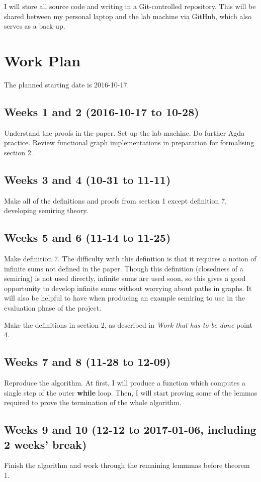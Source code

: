 I will store all source code and writing in a Git-controlled repository.
This will be shared between my personal laptop and the lab machine via GitHub, which also serves as a back-up.

\section*{Work Plan}
The planned starting date is 2016-10-17.

\subsection*{Weeks 1 and 2 (2016-10-17 to 10-28)}
Understand the proofs in the paper. Set up the lab machine. Do further Agda practice. Review functional graph implementations in preparation for formalising section 2.

\subsection*{Weeks 3 and 4 (10-31 to 11-11)}
Make all of the definitions and proofs from section 1 except definition 7, developing semiring theory.

\subsection*{Weeks 5 and 6 (11-14 to 11-25)}
Make definition 7.
The difficulty with this definition is that it requires a notion of infinite sums not defined in the paper.
Though this definition (closedness of a semiring) is not used directly, infinite sums are used soon, so this gives a good opportunity to develop infinite sums without worrying about paths in graphs.
It will also be helpful to have when producing an example semiring to use in the evaluation phase of the project.

Make the definitions in section 2, as described in \emph{Work that has to be done} point 4.

\subsection*{Weeks 7 and 8 (11-28 to 12-09)}
Reproduce the algorithm.
At first, I will produce a function which computes a single step of the outer \textbf{while} loop.
Then, I will start proving some of the lemmas required to prove the termination of the whole algorithm.

\subsection*{Weeks 9 and 10 (12-12 to 2017-01-06, including 2 weeks' break)}
Finish the algorithm and work through the remaining lemmmas before theorem 1.

